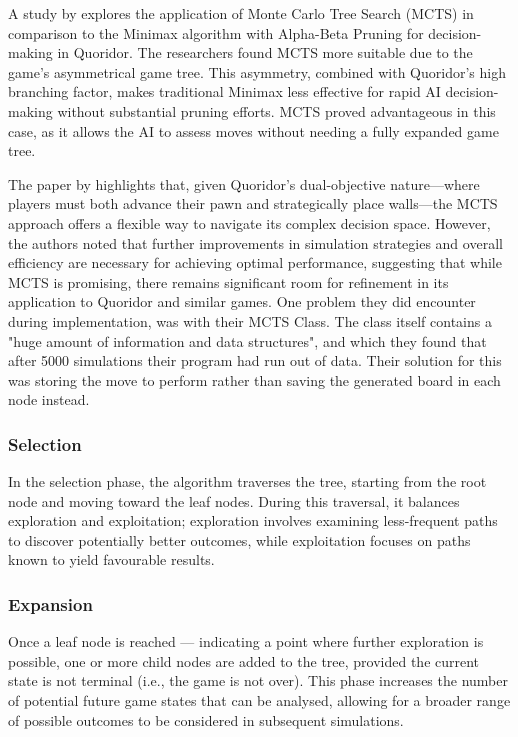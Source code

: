 \documentclass[review]{cmpreport}
\begin{document}
\noindent A study by \cite{brenner2015artificial} explores the application of Monte Carlo Tree Search (MCTS) in comparison to the Minimax algorithm with Alpha-Beta Pruning for decision-making in Quoridor. The researchers found MCTS more suitable due to the game's asymmetrical game tree. This asymmetry, combined with Quoridor's high branching factor, makes traditional Minimax less effective for rapid AI decision-making without substantial pruning efforts. MCTS proved advantageous in this case, as it allows the AI to assess moves without needing a fully expanded game tree.
\newline

\noindent The paper by \cite{respall2018monte} highlights that, given Quoridor's dual-objective nature—where players must both advance their pawn and strategically place walls—the MCTS approach offers a flexible way to navigate its complex decision space. However, the authors noted that further improvements in simulation strategies and overall efficiency are necessary for achieving optimal performance, suggesting that while MCTS is promising, there remains significant room for refinement in its application to Quoridor and similar games. One problem they did encounter during implementation, was with their MCTS Class. The class itself contains a "huge amount of information and data structures", and which they found that after 5000 simulations their program had run out of data. Their solution for this was storing the move to perform rather than saving the generated board in each node instead.

\subsubsection{Selection}
In the selection phase, the algorithm traverses the tree, starting from the root node and moving toward the leaf nodes. During this traversal, it balances exploration and exploitation; exploration involves examining less-frequent paths to discover potentially better outcomes, while exploitation focuses on paths known to yield favourable results.

\subsubsection{Expansion}
Once a leaf node is reached — indicating a point where further exploration is possible, one or more child nodes are added to the tree, provided the current state is not terminal (i.e., the game is not over). This phase increases the number of potential future game states that can be analysed, allowing for a broader range of possible outcomes to be considered in subsequent simulations.
\end{document}

